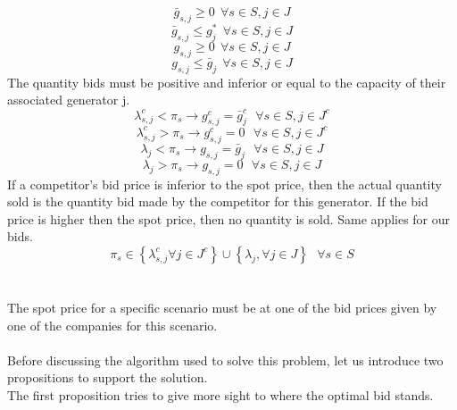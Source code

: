 \documentclass[letterpaper]{article}
\begin{document}
\begin{equation}
\bar{g}_{s,j} \ge 0 \  \ \forall s \in S, j \in J
\end{equation}
\begin{equation}
\bar{g}_{s,j} \le g^*_j \ \  \forall s \in S, j \in J
\end{equation}
\begin{equation}
g_{s,j} \ge 0 \ \  \forall s \in S, j \in J
\end{equation}
\begin{equation}
g_{s,j} \le \bar{g}_j \ \   \forall s \in S, j \in J
\end{equation}
The quantity bids must be positive and inferior or equal to the capacity of their associated generator j.\\
\begin{equation}
\lambda^c_{s,j} < \pi_s \rightarrow g^c_{s,j} = \bar{g}^{c}_j \ \ \  \forall s \in S, j \in J^c
\end{equation}
\begin{equation}
\lambda^c_{s,j} > \pi_s \rightarrow g^c_{s,j} = 0 \ \ \  \forall s \in S, j \in J^c
\end{equation}
\begin{equation}
 \lambda_{j} < \pi_s \rightarrow g_{s,j} = \bar{g}_j \ \ \  \forall s \in S, j \in J
\end{equation}
\begin{equation}
\lambda_{j} > \pi_s \rightarrow g_{s,j} = 0 \ \ \  \forall s \in S, j \in J
\end{equation}
If a competitor's bid price is inferior to the spot price, then the actual quantity sold is the quantity bid made by the competitor for this generator. If the bid price is higher then the spot price, then no quantity is sold. Same applies for our bids.\\
\begin{equation}
\pi_s \in \left\{ \lambda^c_{s,j} \forall j \in J^c \right\} \cup \left\{ \lambda_j, \forall j \in J \right\} \ \ \  \forall s \in S
\end{equation}\\ \\
The spot price for a specific scenario must be at one of the bid prices given by one of the companies for this scenario.\\ \\
Before discussing the algorithm used to solve this problem, let us introduce two propositions to support the solution.\\ 
The first proposition tries to give more sight to where the optimal bid stands.
\end{document}
